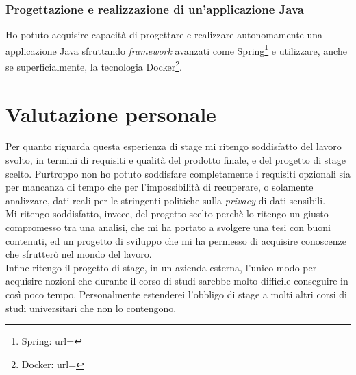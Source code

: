 \subsubsection{Progettazione e realizzazione di un'applicazione Java}
Ho potuto acquisire capacità di progettare e realizzare autonomamente una applicazione Java sfruttando \textit{\gls{framework}} avanzati come Spring\footnote{Spring: url= } e utilizzare, anche se superficialmente, la tecnologia Docker\footnote{Docker: url= }.
\section{Valutazione personale}
Per quanto riguarda questa esperienza di stage mi ritengo soddisfatto del lavoro svolto, in termini di requisiti e qualità del prodotto finale, e del progetto di stage scelto. Purtroppo non ho potuto soddisfare completamente i requisiti opzionali sia per mancanza di tempo che per l'impossibilità di recuperare, o solamente analizzare, dati reali per le stringenti politiche sulla \textit{privacy} di dati sensibili.\\
Mi ritengo soddisfatto, invece, del progetto scelto perchè lo ritengo un giusto compromesso tra una analisi, che mi ha portato a svolgere una tesi con buoni contenuti, ed un progetto di sviluppo che mi ha permesso di acquisire conoscenze che sfrutterò nel mondo del lavoro.\\
Infine ritengo il progetto di stage, in un azienda esterna, l'unico modo per acquisire nozioni che durante il corso di studi sarebbe molto difficile conseguire in così poco tempo. Personalmente estenderei l'obbligo di stage a molti altri corsi di studi universitari che non lo contengono.
